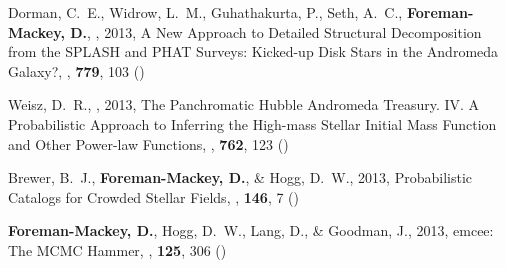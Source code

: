 \item Dorman, C.~E., Widrow, L.~M., Guhathakurta, P., Seth, A.~C.,
    {\bf Foreman-Mackey, D.}, \etal, 2013,
        {A New Approach to Detailed Structural Decomposition from the SPLASH
         and PHAT Surveys: Kicked-up Disk Stars in the Andromeda Galaxy?},
    \apj, \textbf{779}, 103 ()

\item Weisz, D.~R., \etal, 2013,
        {The Panchromatic Hubble Andromeda Treasury. IV. A Probabilistic
         Approach to Inferring the High-mass Stellar Initial Mass Function and
         Other Power-law Functions},
    \apj, \textbf{762}, 123 ()

\item Brewer, B.~J., {\bf Foreman-Mackey, D.}, \& Hogg, D.~W., 2013,
        {Probabilistic Catalogs for Crowded Stellar Fields},
    \aj, \textbf{146}, 7 ()

\item {\bf Foreman-Mackey, D.}, Hogg, D.~W., Lang, D., \& Goodman, J., 2013,
        {emcee: The MCMC Hammer},
    \pasp, \textbf{125}, 306 ()
